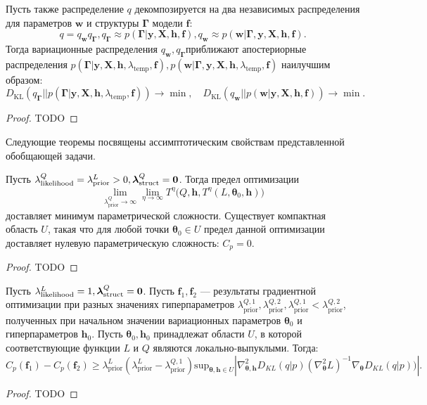 \begin{theorem}
Пусть также распределение $q$ декомпозируется на два независимых распределения для параметров $\mathbf{w}$ и структуры $\boldsymbol{\Gamma}$ модели $\mathbf{f}$:
\[
    q = q_{\mathbf{w}}q_{\boldsymbol{\Gamma}}, q_{\boldsymbol{\Gamma}} \approx p(\boldsymbol{\Gamma}|\mathbf{y}, \mathbf{X}, \mathbf{h}, \mathbf{f}), q_{\mathbf{w}} \approx p(\mathbf{w}|\boldsymbol{\Gamma},\mathbf{y}, \mathbf{X}, \mathbf{h}, \mathbf{f}).
\]
Тогда вариационные распределения $q_{\mathbf{w}}, q_{\boldsymbol{\Gamma}}$приближают апостериорные распределения $ p(\boldsymbol{\Gamma}|\mathbf{y}, \mathbf{X}, \mathbf{h}, \lambda_\text{temp}, \mathbf{f}), p(\mathbf{w}|\boldsymbol{\Gamma},\mathbf{y}, \mathbf{X}, \mathbf{h}, \lambda_\text{temp}, \mathbf{f})$ наилучшим образом:
\[
    {D}_\text{KL}(q_{\boldsymbol{\Gamma}}||p(\boldsymbol{\Gamma}|\mathbf{y}, \mathbf{X}, \mathbf{h}, \lambda_\text{temp}, \mathbf{f})) \to \min, \quad
    {D}_\text{KL}(q_{\mathbf{w}}||p(\mathbf{w}|\mathbf{y}, \mathbf{X}, \mathbf{h}, \mathbf{f})) \to \min.
\]
\end{theorem}
\begin{proof}
TODO
\end{proof}

Следующие теоремы посвящены ассимптотическим свойствам представленной обобщающей задачи.
\begin{theorem}
Пусть ${\lambda_{\text{likelihood}}^Q}= {\lambda_{\text{prior}}^L}>0, {\boldsymbol{\lambda}^Q_{\text{struct}} }= \bf{0}$.
Тогда предел оптимизации
\[
\lim_{{\lambda^Q_\text{prior}} \to \infty} \lim_{\eta \to \infty}   T^\eta\bigl(Q, \mathbf{h}, T^\eta(L, \boldsymbol{\theta}_0, \mathbf{h})\bigr)
\]  
доставляет минимум параметрической сложности. 
Существует компактная область ${U}$, такая что для любой точки $\boldsymbol{\theta}_0 \in U$ предел данной оптимизации доставляет нулевую параметрическую сложность: $C_p = 0$.
\end{theorem}
\begin{proof}
TODO
\end{proof}

\begin{theorem}
Пусть ${\lambda^L_{\text{likelihood}}} = 1 ,{\boldsymbol{\lambda}^Q_{\text{struct}}} = \bf 0$.
Пусть  $\mathbf{f}_1, \mathbf{f}_2$ --- результаты градиентной оптимизации при разных значениях гиперпараметров ${\lambda_{\text{prior}}^{Q,1},\lambda_{\text{prior}}^{Q,2}, \lambda_{\text{prior}}^{Q,1}<\lambda_{\text{prior}}^{Q,2}}$, полученных при начальном значении вариационных параметров $\boldsymbol{\theta}_0$ и гиперпараметров $\mathbf{h}_0$.
Пусть $\boldsymbol{\theta}_0, \mathbf{h}_0$ принадлежат области  $U$, в которой соответствующие функции $L$ и $Q$ являются локально-выпуклыми.
Тогда:
\footnotesize
\[
    C_p(\mathbf{f}_1) - C_p(\mathbf{f}_2)  \geq {\lambda_\text{prior}^L(\lambda_\text{prior}^L - \lambda_\text{prior}^{Q,1})}\text{sup}_{\boldsymbol{\theta}, \mathbf{h} \in U}|\nabla^2_{\boldsymbol{\theta}, \mathbf{h}} {D_{KL}(q|p)} (\nabla^2_{\boldsymbol{\theta}} L)^{-1}   \nabla_{\boldsymbol{\theta}} {D_{KL}(q|p))}|.
\]
\end{theorem}
\begin{proof}
TODO
\end{proof}


